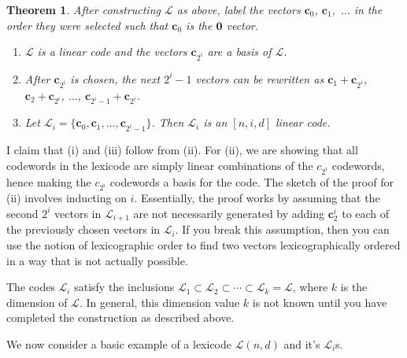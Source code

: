 \documentclass{article}
\theoremstyle{plain}
\newtheorem{theorem}{Theorem}[section]
\theoremstyle{definition}
\begin{document}
\begin{theorem}
After constructing $\mathcal{L}$ as above, label the vectors $\mathbf{c}_0$, $\mathbf{c}_1,$ $\ldots$ in the order they were selected such that $\mathbf{c}_0$ is the $\mathbf{0}$ 
vector.

\begin{enumerate}[{\normalfont (i)}]
\item $\mathcal{L}$ is a linear code and the vectors $\mathbf{c}_{2^i}$ are a basis of $\mathcal{L}$.  
\item After $\mathbf{c}_{2^i}$ is chosen, the next $2^i -1$ vectors can be rewritten as $\mathbf{c}_1 + \mathbf{c}_{2^i}$, $\mathbf{c}_2 + \mathbf{c}_{2^i}$, $\ldots$, 
$\mathbf{c}_{2^i -1} + \mathbf{c}_{2^i}$.
\item Let $\mathcal{L}_i = \{\mathbf{c}_0,\mathbf{c}_1,\ldots,\mathbf{c}_{2^i -1}\}$.  Then $\mathcal{L}_i$ is an $[n,i,d]$ linear code.

\end{enumerate}

\end{theorem}

I claim that (i) and (iii) follow from (ii).  For (ii), we are showing that all codewords in the lexicode are simply linear combinations of 
the $c_{2^i}$ codewords, hence making the $c_{2^i}$ codewords a basis for the code.  The sketch of the proof for (ii) involves inducting on $i$.  Essentially, the proof works
by assuming that the second $2^{i}$ vectors in $\mathcal{L}_{i+1}$ are not necessarily generated by adding $\mathbf{c}_2^{i}$ to each of the previously chosen vectors
in $\mathcal{L}_i$.  If you break this assumption, then you can use the notion of lexicographic order to find two vectors lexicographically ordered in a way that is not actually
possible.

The codes $\mathcal{L}_i$ satisfy the inclusions $\mathcal{L}_1 \subset \mathcal{L}_2 \subset \cdots \subset \mathcal{L}_k = \mathcal{L}$, where $k$ is the dimension of 
$\mathcal{L}$.  In general, this dimension value $k$ is not known until you have completed the construction as described above.

We now consider a basic example of a lexicode $\mathcal{L}(n,d)$ and it's $\mathcal{L}_{i}$s.
\end{document}
